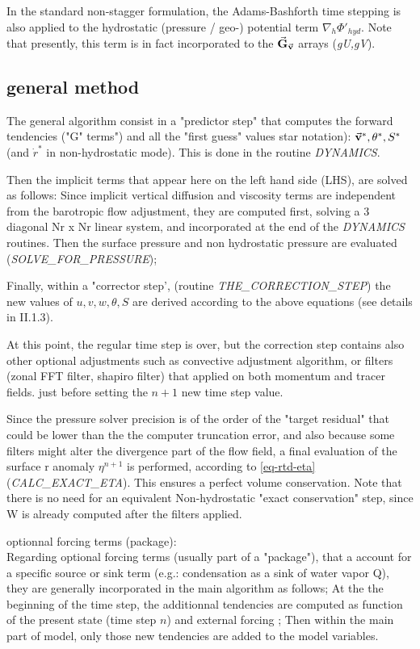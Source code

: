 In the standard non-stagger formulation, 
the Adams-Bashforth time stepping is also applied to the 
hydrostatic (pressure / geo-) potential term $\nabla_h \Phi'_{hyd}$. 
Note that presently, this term is in fact incorporated to the 
$\vec{\bf G}_{\vec{\bf v}}$ arrays ({\it gU,gV}).

\subsection{general method}
 
The general algorithm consist in  a "predictor step" that computes
the forward tendencies ("G" terms") and all 
the "first guess" values star notation): 
$\vec{\bf v}^*, \theta^*, S^*$ (and $\dot{r}^*$
in non-hydrostatic mode). This is done in the routine {\it DYNAMICS}.

Then the implicit terms that appear here on the left hand side (LHS),
are solved as follows:
Since implicit vertical diffusion and viscosity terms 
are independent from the barotropic flow adjustment,
they are computed first, solving a 3 diagonal Nr x Nr linear system, 
and incorporated at the end of the {\it DYNAMICS} routines.
Then the surface pressure and non hydrostatic pressure
are evaluated ({\it SOLVE\_FOR\_PRESSURE}); 

Finally, within a "corrector step', 
(routine {\it THE\_CORRECTION\_STEP})
the new values of $u,v,w,\theta,S$ 
are derived according to the above equations
(see details in II.1.3). 

At this point, the regular time step is over, but  
the correction step contains also other optional
adjustments such as convective adjustment algorithm, or filters 
(zonal FFT filter, shapiro filter)
that applied on both momentum and tracer fields.
just before setting the $n+1$ new time step value.

Since the pressure solver precision is of the order of
the "target residual" that could be lower than the 
the computer truncation error, and also because some filters 
might alter the divergence part of the flow field,
a final evaluation of the surface r anomaly $\eta^{n+1}$
is performed, according to \ref{eq-rtd-eta} ({\it CALC\_EXACT\_ETA}).
This ensures a perfect volume conservation.
Note that there is no need for an equivalent Non-hydrostatic
"exact conservation" step, since W is already computed after 
the filters applied.

optionnal forcing terms (package):\\
Regarding optional forcing terms (usually part of a "package"), 
that a account for a specific source or sink term (e.g.: condensation
as a sink of water vapor Q), they are generally incorporated 
in the main algorithm as follows;
At the the beginning of the time step,
the additionnal tendencies are computed
as function of the present state (time step $n$) and external forcing ;
Then within the main part of model,
only those new tendencies are added to the model variables.

